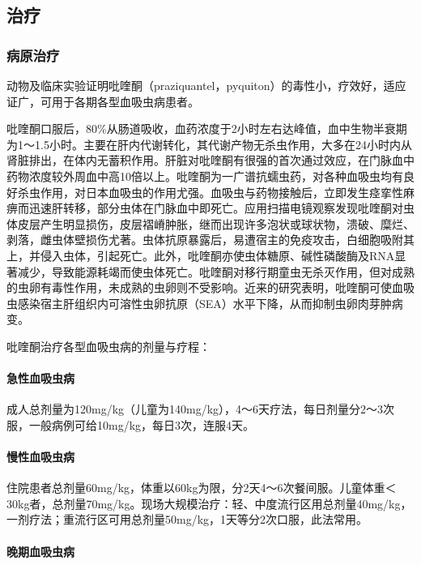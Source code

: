 \subsection{治疗}

\subsubsection{病原治疗}

动物及临床实验证明吡喹酮（praziquantel，pyquiton）的毒性小，疗效好，适应证广，可用于各期各型血吸虫病患者。

吡喹酮口服后，80\%从肠道吸收，血药浓度于2小时左右达峰值，血中生物半衰期为1～1.5小时。主要在肝内代谢转化，其代谢产物无杀虫作用，大多在24小时内从肾脏排出，在体内无蓄积作用。肝脏对吡喹酮有很强的首次通过效应，在门脉血中药物浓度较外周血中高10倍以上。吡喹酮为一广谱抗蠕虫药，对各种血吸虫均有良好杀虫作用，对日本血吸虫的作用尤强。血吸虫与药物接触后，立即发生痉挛性麻痹而迅速肝转移，部分虫体在门脉血中即死亡。应用扫描电镜观察发现吡喹酮对虫体皮层产生明显损伤，皮层褶嵴肿胀，继而出现许多泡状或球状物，溃破、糜烂、剥落，雌虫体壁损伤尤著。虫体抗原暴露后，易遭宿主的免疫攻击，白细胞吸附其上，并侵入虫体，引起死亡。此外，吡喹酮亦使虫体糖原、碱性磷酸酶及RNA显著减少，导致能源耗竭而使虫体死亡。吡喹酮对移行期童虫无杀灭作用，但对成熟的虫卵有毒性作用，未成熟的虫卵则不受影响。近来的研究表明，吡喹酮可使血吸虫感染宿主肝组织内可溶性虫卵抗原（SEA）水平下降，从而抑制虫卵肉芽肿病变。

吡喹酮治疗各型血吸虫病的剂量与疗程：

\paragraph{急性血吸虫病}

成人总剂量为120mg/kg（儿童为140mg/kg），4～6天疗法，每日剂量分2～3次服，一般病例可给10mg/kg，每日3次，连服4天。

\paragraph{慢性血吸虫病}

住院患者总剂量60mg/kg，体重以60kg为限，分2天4～6次餐间服。儿童体重＜
30kg者，总剂量70mg/kg。现场大规模治疗：轻、中度流行区用总剂量40mg/kg，一剂疗法；重流行区可用总剂量50mg/kg，1天等分2次口服，此法常用。

\paragraph{晚期血吸虫病}

